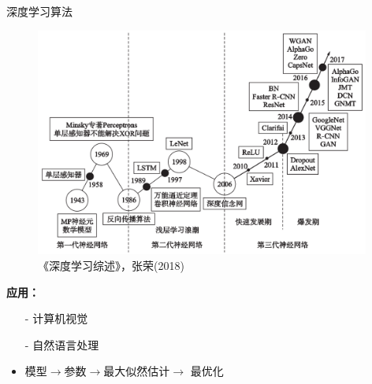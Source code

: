 \documentclass[9pt,t]{beamer} %
\begin{document}
\begin{frame}[t]{深度学习算法}
\begin{minipage}[t]{0.3 \textwidth}
\end{minipage}%
\begin{minipage}[t]{0.68 \textwidth}
\begin{figure}
\centering
\includegraphics[width=0.98\textwidth]{DL-history.png}\\
\tiny{《深度学习综述》，张荣(2018)}
\end{figure}
\begin{minipage}[t]{0.5 \textwidth}
\textbf{应用：}
\begin{itemize}
\item[-] 计算机视觉
\item[-] 自然语言处理
\end{itemize}
\end{minipage}%
\begin{minipage}[t]{0.5 \textwidth}
\begin{itemize}
\setlength\itemsep{0.03em}
\item 模型$\rightarrow$参数$\rightarrow$最大似然估计$\rightarrow$ 最优化
\end{itemize}
\end{minipage}
\end{minipage}
\end{frame}
\end{document}
